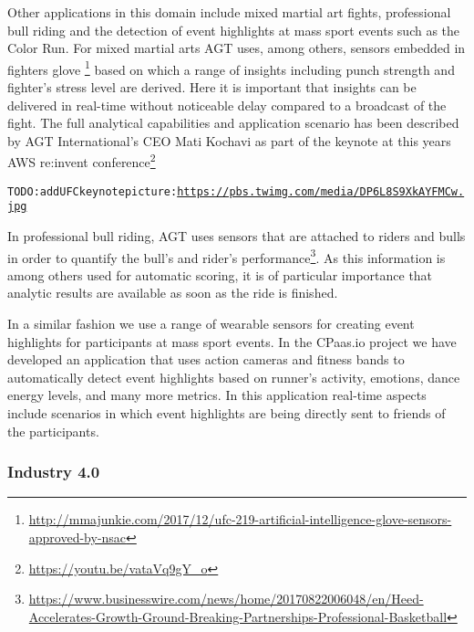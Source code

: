Other applications in this domain include mixed martial art fights, professional bull riding and the detection of event highlights at mass sport events such as the Color Run. For mixed martial arts AGT uses, among others, sensors embedded in fighters glove \footnote{\url{http://mmajunkie.com/2017/12/ufc-219-artificial-intelligence-glove-sensors-approved-by-nsac}} based on which a range of insights including punch strength and fighter's stress level are derived. Here it is important that insights can be delivered in real-time without noticeable delay compared to a broadcast of the fight. The full analytical capabilities and application scenario has been described by AGT International's CEO Mati Kochavi as part of the keynote at this years AWS re:invent conference\footnote{\url{https://youtu.be/vataVq9gY_o}}

\begin{alltt}TODO:\scriptsize add UFC keynote picture: \url{https://pbs.twimg.com/media/DP6L8S9XkAYFMCw.jpg}
\end{alltt}

In professional bull riding, AGT uses sensors that are attached to riders and bulls in order to quantify the bull's and rider's performance\footnote{\url{https://www.businesswire.com/news/home/20170822006048/en/Heed-Accelerates-Growth-Ground-Breaking-Partnerships-Professional-Basketball}}. As this information is among others used for automatic scoring, it is of particular importance that analytic results are available as soon as the ride is finished. 

In a similar fashion we use a range of wearable sensors for creating event highlights for participants at mass sport events. In the CPaas.io project we have developed an application that uses action cameras and fitness bands to automatically detect event highlights based on runner's activity, emotions, dance energy levels, and many more metrics. In this application real-time aspects include scenarios in which event highlights are being directly sent to friends of the participants. 

\subsubsection{Industry 4.0}

